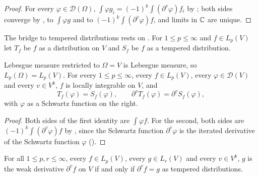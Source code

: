\begin{proof}
\leanok
For every $\varphi \in \mathcal D(\Omega)$,
$\int \varphi g_i = (-1)^k \int (\partial^v \varphi) f_i$ by
; both sides converge by ,
to $\int \varphi g$ and to $(-1)^k \int (\partial^v \varphi) f$, and limits in $\mathbb{C}$ are unique.
\end{proof}

The bridge to tempered distributions rests on . For
$1 \leq p \leq \infty$ and $f \in L_p(V)$ let $T_f$ be $f$ as a distribution on $V$ and
$S_f$ be $f$ as a tempered distribution.

\begin{lemma}
\label{lem:lp-distribution-whole-space}
\leanok
{}
Lebesgue measure restricted to $\Omega = V$ is Lebesgue measure, so $L_p(\Omega) = L_p(V)$. For
every $1 \leq p \leq \infty$, every $f \in L_p(V)$, every $\varphi \in \mathcal D(V)$ and
every $v \in V^k$, $f$ is locally integrable on $V$, and
\[
  T_f(\varphi) = S_f(\varphi), \qquad \partial^v T_f(\varphi) = \partial^v S_f(\varphi),
\]
with $\varphi$ as a Schwartz function on the right.
\end{lemma}

\begin{proof}
\leanok
Both sides of the first identity are $\int \varphi f$. For the second, both sides are
$(-1)^k \int (\partial^v \varphi) f$ by , since the Schwartz
function $\partial^v \varphi$ is the iterated derivative of the Schwartz function $\varphi$
().
\end{proof}

\begin{theorem}
\label{thm:weak-derivative-tempered}
\leanok
{}
For all $1 \leq p, r \leq \infty$, every $f \in L_p(V)$, every $g \in L_r(V)$ and every
$v \in V^k$, $g$ is the weak derivative $\partial^v f$ on $V$ if and only if $\partial^v f = g$
as tempered distributions.
\end{theorem}

